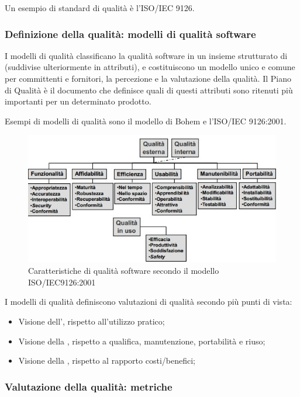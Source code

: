 Un esempio di standard di qualità è l'ISO/IEC 9126.

\subsubsection{Definizione della qualità: modelli di qualità software}

I modelli di qualità classificano la qualità software in un insieme strutturato
di  (suddivise ulteriormente in attributi), e
costituiscono un modello unico e comune per committenti e fornitori,
 la percezione e la valutazione della qualità. Il Piano di
Qualità è il documento che definisce quali di questi attributi sono ritenuti più
importanti per un determinato prodotto.

Esempi di modelli di qualità sono il modello di Bohem e l'ISO/IEC 9126:2001.

\begin{figure}[h]
  \centering
  \includegraphics[scale=0.6]{imgs/isoiec_9126_2001.jpg}
  \caption{Caratteristiche di qualità software secondo il modello
    ISO/IEC9126:2001}
\end{figure}

I modelli di qualità definiscono valutazioni di qualità secondo più punti di
vista:

\begin{itemize}
  \item Visione dell', rispetto all'utilizzo pratico;
  \item Visione della , rispetto a qualifica, manutenzione,
    portabilità e riuso;
  \item Visione della , rispetto al rapporto costi/benefici;
\end{itemize}

\subsubsection{Valutazione della qualità: metriche}

